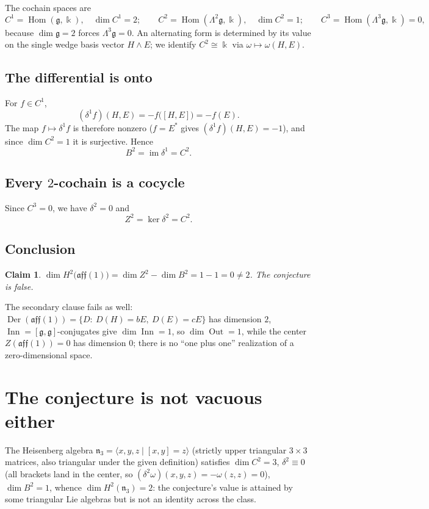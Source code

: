 \documentclass[11pt]{article}
\newtheorem{claim}{Claim}
\begin{document}
The cochain spaces are
\[
C^1=\operatorname{Hom}(\mathfrak{g},\Bbbk),\quad \dim C^1=2;\qquad
C^2=\operatorname{Hom}(\Lambda^2\mathfrak{g},\Bbbk),\quad \dim C^2=1;\qquad
C^3=\operatorname{Hom}(\Lambda^3\mathfrak{g},\Bbbk)=0,
\]
because $\dim\mathfrak{g}=2$ forces $\Lambda^3\mathfrak{g}=0$. An alternating form is determined by its value on the single wedge basis vector $H\wedge E$; we identify $C^2\cong\Bbbk$ via $\omega\mapsto\omega(H,E)$.

\subsection{The differential is onto}

For $f\in C^1$,
\[
(\delta^1 f)(H,E)=-f\bigl([H,E]\bigr)=-f(E).
\]
The map $f\mapsto \delta^1 f$ is therefore nonzero ($f=E^*$ gives $(\delta^1 f)(H,E)=-1$), and since $\dim C^2=1$ it is surjective. Hence
\[
B^2=\operatorname{im}\delta^1=C^2 .
\]

\subsection{Every $2$-cochain is a cocycle}

Since $C^3=0$, we have $\delta^2=0$ and
\[
Z^2=\ker\delta^2=C^2 .
\]

\subsection{Conclusion}

\begin{claim}\label{cl:main}
$\dim H^2\bigl(\mathfrak{aff}(1)\bigr)=\dim Z^2-\dim B^2=1-1=0\neq 2$. The conjecture is false.
\end{claim}

The secondary clause fails as well: $\operatorname{Der}(\mathfrak{aff}(1))=\{D:\ D(H)=bE,\ D(E)=cE\}$ has dimension $2$, $\operatorname{Inn}= [\mathfrak{g},\mathfrak{g}]$-conjugates give $\dim\operatorname{Inn}=1$, so $\dim\operatorname{Out}=1$, while the center $Z(\mathfrak{aff}(1))=0$ has dimension $0$; there is no ``one plus one'' realization of a zero-dimensional space.

\section{The conjecture is not vacuous either}

The Heisenberg algebra $\mathfrak{n}_3=\langle x,y,z\mid [x,y]=z\rangle$ (strictly upper triangular $3\times3$ matrices, also triangular under the given definition) satisfies $\dim C^2=3$, $\delta^2\equiv 0$ (all brackets land in the center, so $(\delta^2\omega)(x,y,z)=-\omega(z,z)=0$), $\dim B^2=1$, whence $\dim H^2(\mathfrak{n}_3)=2$: the conjecture's value is attained by some triangular Lie algebras but is not an identity across the class.
\end{document}
